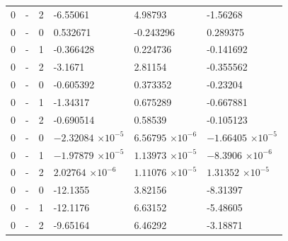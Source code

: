 \begin{longtable}
{}0 & \allowbreak{}-\allowbreak{} & 2 & -6.55061 & 4.98793 & -1.56268 \\
{}0 & \allowbreak{}-\allowbreak{} & 0 & 0.532671 & -0.243296 & 0.289375 \\
{}0 & \allowbreak{}-\allowbreak{} & 1 & -0.366428 & 0.224736 & -0.141692 \\
{}0 & \allowbreak{}-\allowbreak{} & 2 & -3.1671 & 2.81154 & -0.355562 \\
{}0 & \allowbreak{}-\allowbreak{} & 0 & -0.605392 & 0.373352 & -0.23204 \\
{}0 & \allowbreak{}-\allowbreak{} & 1 & -1.34317 & 0.675289 & -0.667881 \\
{}0 & \allowbreak{}-\allowbreak{} & 2 & -0.690514 & 0.58539 & -0.105123 \\
{}0 & \allowbreak{}-\allowbreak{} & 0 &  &  &  \\
{}0 & \allowbreak{}-\allowbreak{} & 1 &  &  &  \\
{}0 & \allowbreak{}-\allowbreak{} & 2 &  &  &  \\
{}0 & \allowbreak{}-\allowbreak{} & 0 & -12.1355 & 3.82156 & -8.31397 \\
{}0 & \allowbreak{}-\allowbreak{} & 1 & -12.1176 & 6.63152 & -5.48605 \\
{}0 & \allowbreak{}-\allowbreak{} & 2 & -9.65164 & 6.46292 & -3.18871 \\

\end{longtable}
